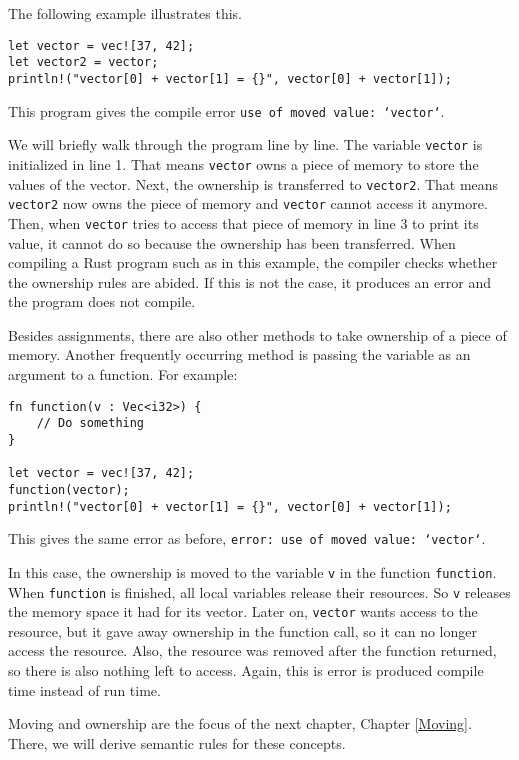 The following example illustrates this. 
\begin{verbatim}
let vector = vec![37, 42];
let vector2 = vector;
println!("vector[0] + vector[1] = {}", vector[0] + vector[1]);
\end{verbatim}
This program gives the compile error \texttt{use of moved value: `vector`}. 

We will briefly walk through the program line by line. The variable \verb|vector| is initialized in line 1. That means \verb|vector| owns a piece of memory to store the values of the vector. Next, the ownership is transferred to \verb|vector2|. That means \verb|vector2| now owns the piece of memory and \verb|vector| cannot access it anymore. Then, when \verb|vector| tries to access that piece of memory in line 3 to print its value, it cannot do so because the ownership has been transferred. When compiling a Rust program such as in this example, the compiler checks whether the ownership rules are abided. If this is not the case, it produces an error and the program does not compile. 

Besides assignments, there are also other methods to take ownership of a piece of memory. Another frequently occurring method is passing the variable as an argument to a function. For example:

\begin{verbatim}
fn function(v : Vec<i32>) {
    // Do something
}

let vector = vec![37, 42];
function(vector);
println!("vector[0] + vector[1] = {}", vector[0] + vector[1]);
\end{verbatim}
This gives the same error as before, \texttt{error: use of moved value: `vector`}. 

In this case, the ownership is moved to the variable \verb|v| in the function \texttt{function}. When \verb|function| is finished, all local variables release their resources. So \verb|v| releases the memory space it had for its vector. Later on, \verb|vector| wants access to the resource, but it gave away ownership in the function call, so it can no longer access the resource. Also, the resource was removed after the function returned, so there is also nothing left to access. Again, this is error is produced compile time instead of run time. 

Moving and ownership are the focus of the next chapter, Chapter \ref{Moving}. There, we will derive semantic rules for these concepts. 

